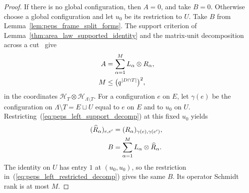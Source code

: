 \begin{proof}\leanok
    If there is no global configuration, then $A=0$, and take $B=0$.
    Otherwise choose a global configuration and let $u_0$ be its restriction
    to $U$. Take $B$ from Lemma~\ref{lem:peps_frame_split_forms}.
    The support criterion of Lemma~\ref{thm:area_law_supported_identity}
    and the matrix-unit decomposition across a cut~\cite[``Matrix-unit
        decomposition across a cut'']{QICLean2026Blueprint} give
    \begin{align}
        A & =\sum_{\alpha=1}^{M}L_\alpha\otimes R_\alpha,\notag                \\
        M & \le\bigl(q^{|D\cap T|}\bigr)^2,\label{eq:peps_left_support_decomp}
    \end{align}
    in the coordinates
    $\mathcal H_T\otimes\mathcal H_{\Lambda\setminus T}$.
    For a configuration $e$ on $E$, let $\gamma(e)$ be the configuration on
    $\Lambda\setminus T=E\sqcup U$ equal to $e$ on $E$ and to $u_0$ on $U$.
    Restricting~(\ref{eq:peps_left_support_decomp}) at this fixed $u_0$ yields
    \begin{align}
        (\widehat R_\alpha)_{e,e'}
          & =(R_\alpha)_{\gamma(e),\gamma(e')},\notag                                                   \\
        B & =\sum_{\alpha=1}^{M}L_\alpha\otimes\widehat R_\alpha.\label{eq:peps_left_restricted_decomp}
    \end{align}
    The identity on $U$ has entry $1$ at $(u_0,u_0)$, so the restriction
    in~(\ref{eq:peps_left_restricted_decomp}) gives the same $B$. Its operator Schmidt rank is at most $M$.
\end{proof}

